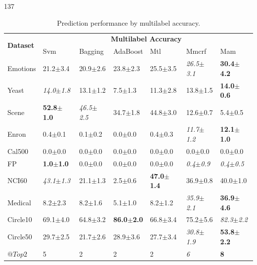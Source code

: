 \documentclass[a4poster]{article}
\begin{document}
\begin{textblock}{137}
\begin{multicols}{2}
	\begin{table}
		\small
		\caption{Prediction performance by multilabel accuracy.}
			\vspace{-5mm}
		\label{prediction_performance_2}
		\begin{center}
		\begin{tiny}
		\begin{sc}
	\begin{tabular}{|p{0.65cm}|p{0.52cm}|p{0.55cm}|p{0.68cm}|p{0.52cm}|p{0.55cm}|p{0.52cm}|} \hline
			\multirow{2}{*}{\textbf{Dataset}} 
			& \multicolumn{6}{c|}{\textbf{Multilabel Accuracy}} \\ \cline{2-7} 
		    & Svm & Bagging & AdaBoost & Mtl & Mmcrf & Mam\\ \cline{1-7}
			Emotions & {21.2}$\pm${3.4} & {20.9}$\pm${2.6} & {23.8}$\pm${2.3} & {25.5}$\pm${3.5} & \em{26.5}$\pm${3.1} & \bf{30.4}$\pm${4.2} \\ \hline
			Yeast & \em{14.0}$\pm${1.8} & {13.1}$\pm${1.2} & {7.5}$\pm${1.3} & {11.3}$\pm${2.8} & {13.8}$\pm${1.5} & \bf{14.0}$\pm${0.6} \\ \hline
			Scene & \bf{52.8}$\pm${1.0} & \em{46.5}$\pm${2.5} & {34.7}$\pm${1.8} & {44.8}$\pm${3.0} & {12.6}$\pm${0.7} & {5.4}$\pm${0.5} \\ \hline
			Enron & {0.4}$\pm${0.1} & {0.1}$\pm${0.2} & {0.0}$\pm${0.0} & {0.4}$\pm${0.3} & \em{11.7}$\pm${1.2} & \bf{12.1}$\pm${1.0} \\ \hline
			Cal500 & {0.0}$\pm${0.0} & {0.0}$\pm${0.0} & {0.0}$\pm${0.0} & {0.0}$\pm${0.0} & {0.0}$\pm${0.0} & {0.0}$\pm${0.0} \\ \hline
			FP & \bf{1.0}$\pm${1.0} & {0.0}$\pm${0.0} & {0.0}$\pm${0.0} & {0.0}$\pm${0.0} & \em{0.4}$\pm${0.9} & \em{0.4}$\pm${0.5} \\ \hline
			NCI60 & \em{43.1}$\pm${1.3} & {21.1}$\pm${1.3} & {2.5}$\pm${0.6} & \bf{47.0}$\pm${1.4} & {36.9}$\pm${0.8} & {40.0}$\pm${1.0} \\ \hline
			Medical & {8.2}$\pm${2.3} & {8.2}$\pm${1.6} & {5.1}$\pm${1.0} & {8.2}$\pm${1.2} & \em{35.9}$\pm${2.1} & \bf{36.9}$\pm${4.6} \\ \hline
			Circle10 & {69.1}$\pm${4.0} & {64.8}$\pm${3.2} & \bf{86.0}$\pm${2.0} & {66.8}$\pm${3.4} & {75.2}$\pm${5.6} & \em{82.3}$\pm${2.2} \\ \hline
			Circle50 & {29.7}$\pm${2.5} & {21.7}$\pm${2.6} & {28.9}$\pm${3.6} & {27.7}$\pm${3.4} & \em{30.8}$\pm${1.9} & \bf{53.8}$\pm${2.2} \\ \hline
			$@Top2$ & {5} & {2} & {2} & {2} & \em{6} & \bf{8} \\ \hline
		\end{tabular}
		\end{sc}
		\end{tiny}
		\end{center}
	\end{table}	

	\end{multicols}
\end{textblock}
\end{document}
